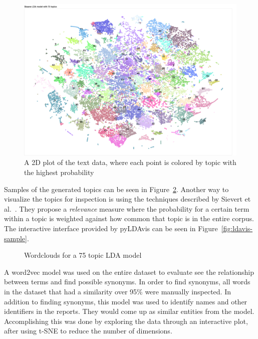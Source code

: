 \begin{figure}
    \centering
    \includegraphics[scale=0.25]{figures/lda-2d-distribution.png}
    \caption{A 2D plot of the text data, where each point is colored by topic with the highest probability}
    \label{fig:lda-dist}
\end{figure}

Samples of the generated topics can be seen in Figure~\ref{fig:topic-wordclouds}.
Another way to visualize the topics for inspection is using the techniques described by Sievert et al\@.~\cite{sievert2014ldavis}.
They propose a \textit{relevance} measure where the probability for a certain term within a topic is weighted against how common that topic is in the entire corpus.
The interactive interface provided by pyLDAvis can be seen in Figure~\ref{fig:ldavis-sample}.

\begin{figure}
    \centering
    \caption{Wordclouds for a 75 topic LDA model}
    \label{fig:topic-wordclouds}
\end{figure}

A word2vec model was used on the entire dataset to evaluate see the relationship between terms and find possible synonyms.
In order to find synonyms, all words in the dataset that had a similarity over 95\% were manually inspected.
In addition to finding synonyms, this model was used to identify names and other identifiers in the reports.
They would come up as similar entities from the model.
Accomplishing this was done by exploring the data through an interactive plot, after using t-SNE to reduce the number of dimensions.

